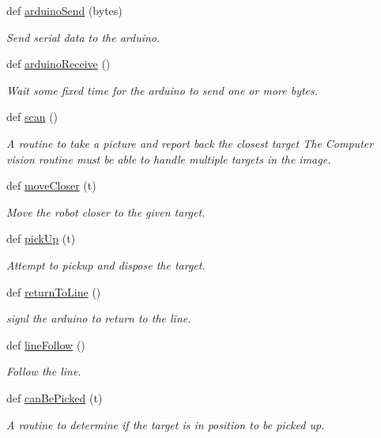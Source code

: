 \begin{DoxyCompactItemize}
\item 
def \mbox{\hyperlink{namespaceSyringenator_ae7978d5b84170226249d8de2e204e762}{arduino\+Send}} (bytes)
\begin{DoxyCompactList}\small\item\em Send serial data to the arduino. \end{DoxyCompactList}\item 
def \mbox{\hyperlink{namespaceSyringenator_a1c5a8cf020e400c8c0337977a5b6d921}{arduino\+Receive}} ()
\begin{DoxyCompactList}\small\item\em Wait some fixed time for the arduino to send one or more bytes. \end{DoxyCompactList}\item 
def \mbox{\hyperlink{namespaceSyringenator_aff01237d3ff3e33f0ffc32927d813df0}{scan}} ()
\begin{DoxyCompactList}\small\item\em A routine to take a picture and report back the closest target The Computer vision routine must be able to handle multiple targets in the image. \end{DoxyCompactList}\item 
def \mbox{\hyperlink{namespaceSyringenator_a6aecf5518c352d012eb1422d9970146d}{move\+Closer}} (t)
\begin{DoxyCompactList}\small\item\em Move the robot closer to the given target. \end{DoxyCompactList}\item 
def \mbox{\hyperlink{namespaceSyringenator_a9409dbfa8ede969288bb659ef23befb6}{pick\+Up}} (t)
\begin{DoxyCompactList}\small\item\em Attempt to pickup and dispose the target. \end{DoxyCompactList}\item 
def \mbox{\hyperlink{namespaceSyringenator_afe04905c8a4a9d077457422866633203}{return\+To\+Line}} ()
\begin{DoxyCompactList}\small\item\em signl the arduino to return to the line. \end{DoxyCompactList}\item 
def \mbox{\hyperlink{namespaceSyringenator_a824ef6e71bc0975483435ffbdd58cb3e}{line\+Follow}} ()
\begin{DoxyCompactList}\small\item\em Follow the line. \end{DoxyCompactList}\item 
def \mbox{\hyperlink{namespaceSyringenator_acb08d40f080a03cb4e7a43ee3ab4854b}{can\+Be\+Picked}} (t)
\begin{DoxyCompactList}\small\item\em A routine to determine if the target is in position to be picked up. \end{DoxyCompactList}\end{DoxyCompactItemize}
